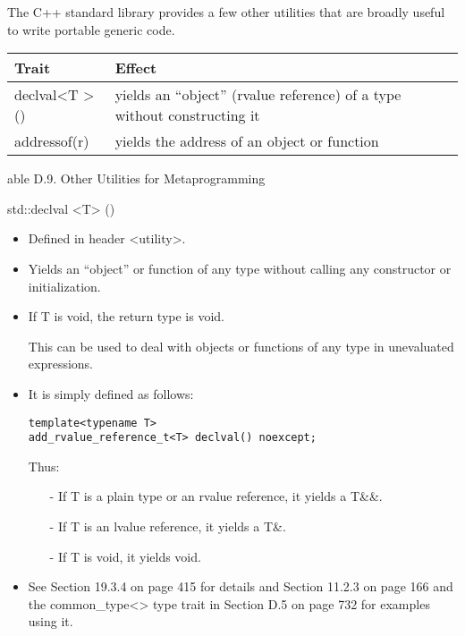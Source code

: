 

The C++ standard library provides a few other utilities that are broadly useful to write portable generic code.

\begin{table}[H]
	\begin{center}
	\begin{tabular}{l|l}
		\hline
		\textbf{Trait}                       & \textbf{Effect}                                                         \\ \hline
		declval\textless{}T \textgreater{}() & yields an “object” (rvalue reference) of a type without constructing it \\ \hline
		addressof(r)                         & yields the address of an object or function                             \\ \hline
	\end{tabular}
	\end{center}
\end{table}

\begin{center}
able D.9. Other Utilities for Metaprogramming
\end{center}

std::declval <T> ()

\begin{itemize}
\item 
Defined in header <utility>.

\item 
Yields an “object” or function of any type without calling any constructor or initialization.

\item 
If T is void, the return type is void.

This can be used to deal with objects or functions of any type in unevaluated expressions.

\item 
It is simply defined as follows:
\begin{lstlisting}[style=styleCXX]
template<typename T>
add_rvalue_reference_t<T> declval() noexcept;
\end{lstlisting}
Thus:

\begin{itemize}
\item[-]
If T is a plain type or an rvalue reference, it yields a T\&\&.

\item[-]
If T is an lvalue reference, it yields a T\&.

\item[-]
If T is void, it yields void.
\end{itemize}

\item 
See Section 19.3.4 on page 415 for details and Section 11.2.3 on page 166 and the common\_type<> type trait in Section D.5 on page 732 for examples using it.
\end{itemize}

